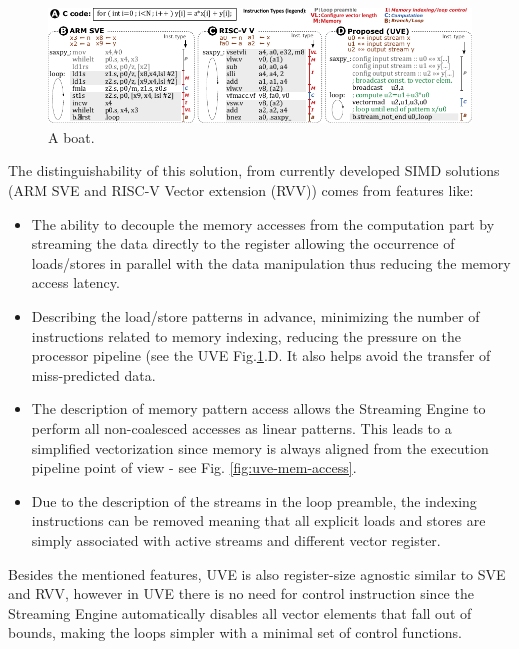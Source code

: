 
\begin{figure}[H]
    \centering
    \includegraphics[width=0.77\linewidth]{images/UVE-Comparison.pdf}
    \caption{A boat.}
    \label{fig:uve-comparison}
\end{figure}

The distinguishability of this solution, from  currently developed SIMD solutions (ARM SVE and RISC-V Vector extension (RVV)) comes from features like:
\begin{itemize}
\item[]   The ability to decouple the memory accesses from the computation part by streaming the data directly to the register allowing the occurrence of loads/stores in parallel with the data manipulation thus reducing the memory access latency.
\item[]   Describing the load/store patterns in advance, minimizing the number of instructions related to memory indexing, reducing the pressure on the processor pipeline (see the UVE Fig.\ref{fig:uve-comparison}.D. It also helps avoid the transfer of miss-predicted data.
\item[]   The description of memory pattern access allows the Streaming Engine to perform all non-coalesced accesses as linear patterns. This leads to a simplified vectorization since memory is always aligned from the execution pipeline point of view - see Fig. \ref{fig:uve-mem-access}. 
\item[]   Due to the description of the streams in the loop preamble, the indexing instructions can be removed meaning that all explicit loads and stores are simply associated with active streams and different vector register.
\end{itemize}

Besides the mentioned features, UVE is also register-size agnostic similar to SVE and RVV, however in UVE there is no need for control instruction since the Streaming Engine automatically disables all vector elements that fall out of bounds, making the loops simpler with a minimal set of control functions.



